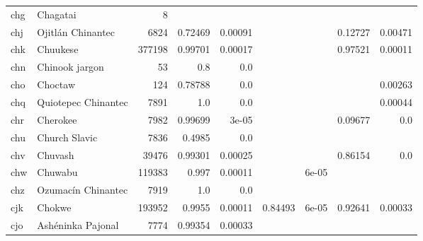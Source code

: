 \documentclass[11pt]{article}
\begin{document}
\begin{table*}[h]
{\begin{tabular}{llrrrrrrr}
chg         & Chagatai         & 8         &          &          &          &          &          &          \\

chj         & Ojitlán Chinantec         & 6824         & 0.72469         & 0.00091         &          &          & 0.12727         & 0.00471         \\

chk         & Chuukese         & 377198         & 0.99701         & 0.00017         &          &          & 0.97521         & 0.00011         \\

chn         & Chinook jargon         & 53         & 0.8         & 0.0         &          &          &          &          \\

cho         & Choctaw         & 124         & 0.78788         & 0.0         &          &          &          & 0.00263         \\

chq         & Quiotepec Chinantec         & 7891         & 1.0         & 0.0         &          &          &          & 0.00044         \\

chr         & Cherokee         & 7982         & 0.99699         & 3e-05         &          &          & 0.09677         & 0.0         \\

chu         & Church Slavic         & 7836         & 0.4985         & 0.0         &          &          &          &          \\

chv         & Chuvash         & 39476         & 0.99301         & 0.00025         &          &          & 0.86154         & 0.0         \\

chw         & Chuwabu         & 119383         & 0.997         & 0.00011         &          & 6e-05         &          &          \\

chz         & Ozumacín Chinantec         & 7919         & 1.0         & 0.0         &          &          &          &          \\

cjk         & Chokwe         & 193952         & 0.9955         & 0.00011         & 0.84493         & 6e-05         & 0.92641         & 0.00033         \\

cjo         & Ashéninka Pajonal         & 7774         & 0.99354         & 0.00033         &          &          &          &          \\


\end{tabular}}
\end{table*}
\end{document}
